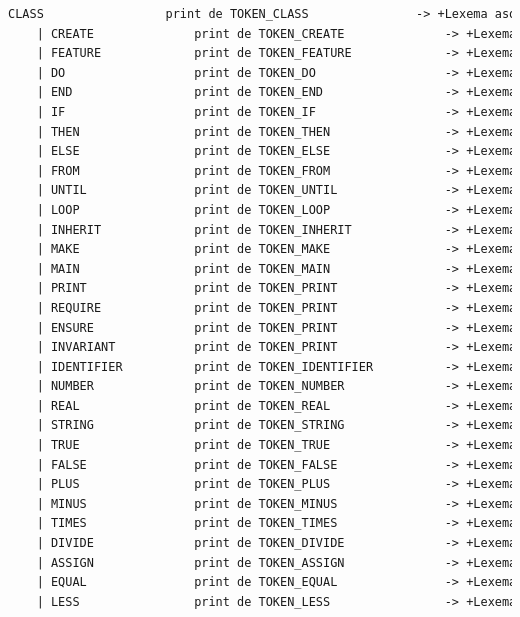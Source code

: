 \documentclass[a4paper,12pt]{article}
\begin{document}
\begin{lstlisting}[language=Eiffel, style=myeiffel]
    CLASS                 print de TOKEN_CLASS               -> +Lexema asociado
    | CREATE              print de TOKEN_CREATE              -> +Lexema asociado
    | FEATURE             print de TOKEN_FEATURE             -> +Lexema asociado
    | DO                  print de TOKEN_DO                  -> +Lexema asociado
    | END                 print de TOKEN_END                 -> +Lexema asociado
    | IF                  print de TOKEN_IF                  -> +Lexema asociado
    | THEN                print de TOKEN_THEN                -> +Lexema asociado
    | ELSE                print de TOKEN_ELSE                -> +Lexema asociado
    | FROM                print de TOKEN_FROM                -> +Lexema asociado
    | UNTIL               print de TOKEN_UNTIL               -> +Lexema asociado
    | LOOP                print de TOKEN_LOOP                -> +Lexema asociado
    | INHERIT             print de TOKEN_INHERIT             -> +Lexema asociado
    | MAKE                print de TOKEN_MAKE                -> +Lexema asociado
    | MAIN                print de TOKEN_MAIN                -> +Lexema asociado
    | PRINT               print de TOKEN_PRINT               -> +Lexema asociado
    | REQUIRE             print de TOKEN_PRINT               -> +Lexema asociado
    | ENSURE              print de TOKEN_PRINT               -> +Lexema asociado
    | INVARIANT           print de TOKEN_PRINT               -> +Lexema asociado
    | IDENTIFIER          print de TOKEN_IDENTIFIER          -> +Lexema asociado
    | NUMBER              print de TOKEN_NUMBER              -> +Lexema asociado
    | REAL                print de TOKEN_REAL                -> +Lexema asociado
    | STRING              print de TOKEN_STRING              -> +Lexema asociado
    | TRUE                print de TOKEN_TRUE                -> +Lexema asociado
    | FALSE               print de TOKEN_FALSE               -> +Lexema asociado
    | PLUS                print de TOKEN_PLUS                -> +Lexema asociado
    | MINUS               print de TOKEN_MINUS               -> +Lexema asociado
    | TIMES               print de TOKEN_TIMES               -> +Lexema asociado
    | DIVIDE              print de TOKEN_DIVIDE              -> +Lexema asociado
    | ASSIGN              print de TOKEN_ASSIGN              -> +Lexema asociado
    | EQUAL               print de TOKEN_EQUAL               -> +Lexema asociado
    | LESS                print de TOKEN_LESS                -> +Lexema asociado

\end{lstlisting}
\end{document}

